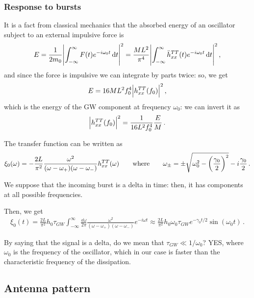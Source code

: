 \documentclass[main.tex]{subfiles}
\begin{document}
\subsubsection{Response to bursts}

It is a fact from classical mechanics that the absorbed energy of an oscillator subject to an external impulsive force is 
%
\begin{align}
E 
= \frac{1}{2 m_0 } \abs{ \int_{ - \infty }^{ \infty  } F(t) e^{-i \omega_0 t} \dd{t}}^2
= \frac{ML^2}{\pi^{4} } \abs{ \int_{ - \infty }^{ \infty  } \ddot{h}_{xx}^{TT}(t) e^{-i \omega_0 t} \dd{t}}^2
\,,
\end{align}
%
and since the force is impulsive we can integrate by parts twice: so, we get 
%
\begin{align}
E = 16 M L^2 f_0^{4} \abs{h_{xx}^{TT} (f_0 )}^2
\,,
\end{align}
%
which is the energy of the GW component at frequency \(\omega_0 \): we can invert it as 
%
\begin{align}
\abs{h_{xx}^{TT} (f_0 )}^2 = \frac{1}{16L^2 f_0^{4}} \frac{E}{M}
\,.
\end{align}

The transfer function can be written as 
%
\begin{align}
\xi_0 (\omega ) = - \frac{2L}{\pi^2} \frac{\omega^2}{(\omega - \omega_{+}) (\omega-\omega_{-})} h^{TT}_{xx} (\omega )
\qquad \text{where} \qquad
\omega_{\pm} = \pm \sqrt{\omega_0 ^2 - \qty(\frac{\gamma_0 }{2})^2} - i \frac{\gamma_0 }{2}
\,.
\end{align}

We suppose that the incoming burst is a delta in time: then, it has components at all possible frequencies.

Then, we get 
%
\begin{align}
\xi_0 (t) = \frac{2L}{\pi^2} h_0 \tau_{GW} \int_{- \infty }^{ \infty } \frac{ \dd{\omega }}{2 \pi } \frac{\omega^2}{(\omega - \omega_{+}) (\omega-\omega_{-})} e^{-i \omega t} \approx \frac{2L }{\pi^2} h_0 \omega_0 \tau_{GW} e^{-\gamma_0 t / 2} \sin(\omega_0 t)
\,.
\end{align}

By saying that the signal is a delta, do we mean that \(\tau_{GW} \ll 1 / \omega_0 \)? YES, where \(\omega_0 \) is the frequency of the oscillator, which in our case is faster than the characteristic frequency of the dissipation. 

\subsection{Antenna pattern}
\end{document}
